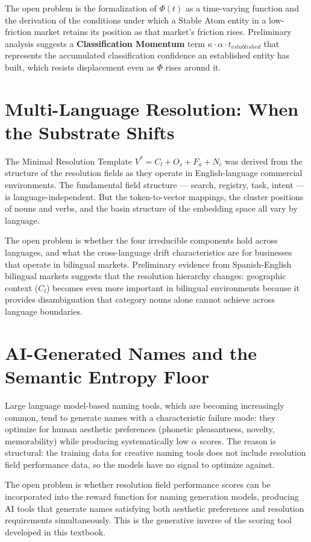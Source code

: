 \documentclass[12pt, openany]{book}
\theoremstyle{thmstyle}
\theoremstyle{defstyle}
\newcommand{\vstar}{V^{*}}
\begin{document}
The open problem is the formalization of $\Phi(t)$ as a time-varying function and the derivation of the conditions under which a Stable Atom entity in a low-friction market retains its position as that market's friction rises. Preliminary analysis suggests a \textbf{Classification Momentum} term $\kappa \cdot \alpha \cdot t_{established}$ that represents the accumulated classification confidence an established entity has built, which resists displacement even as $\Phi$ rises around it.

\section{Multi-Language Resolution: When the Substrate Shifts}

The Minimal Resolution Template $\vstar = C_l + O_s + F_a + N_c$ was derived from the structure of the resolution fields as they operate in English-language commercial environments. The fundamental field structure --- search, registry, task, intent --- is language-independent. But the token-to-vector mappings, the cluster positions of nouns and verbs, and the basin structure of the embedding space all vary by language.

The open problem is whether the four irreducible components hold across languages, and what the cross-language drift characteristics are for businesses that operate in bilingual markets. Preliminary evidence from Spanish-English bilingual markets suggests that the resolution hierarchy changes: geographic context ($C_l$) becomes even more important in bilingual environments because it provides disambiguation that category nouns alone cannot achieve across language boundaries.

\section{AI-Generated Names and the Semantic Entropy Floor}

Large language model-based naming tools, which are becoming increasingly common, tend to generate names with a characteristic failure mode: they optimize for human aesthetic preferences (phonetic pleasantness, novelty, memorability) while producing systematically low $\alpha$ scores. The reason is structural: the training data for creative naming tools does not include resolution field performance data, so the models have no signal to optimize against.

The open problem is whether resolution field performance scores can be incorporated into the reward function for naming generation models, producing AI tools that generate names satisfying both aesthetic preferences and resolution requirements simultaneously. This is the generative inverse of the scoring tool developed in this textbook.
\end{document}
